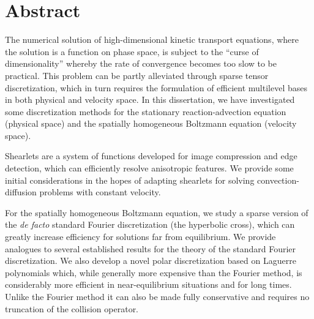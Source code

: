 \chapter*{Abstract}

The numerical solution of high-dimensional kinetic transport equations, where the solution is a function on
phase space, is subject to the ``curse of dimensionality'' whereby the rate of convergence becomes too slow to
be practical. This problem can be partly alleviated through sparse tensor discretization, which in turn
requires the formulation of efficient multilevel bases in both physical and velocity space. In this
dissertation, we have investigated some discretization methods for the stationary reaction-advection equation
(physical space) and the spatially homogeneous Boltzmann equation (velocity space).

Shearlets are a system of functions developed for image compression and edge detection, which can efficiently
resolve anisotropic features. We provide some initial considerations in the hopes of adapting shearlets for
solving convection-diffusion problems with constant velocity.

For the spatially homogeneous Boltzmann equation, we study a sparse version of the {\em de facto} standard
Fourier discretization (the hyperbolic cross), which can greatly increase efficiency for solutions far from
equilibrium. We provide analogues to several established results for the theory of the standard Fourier
discretization. We also develop a novel polar discretization based on Laguerre polynomials which, while
generally more expensive than the Fourier method, is considerably more efficient in near-equilibrium
situations and for long times. Unlike the Fourier method it can also be made fully conservative and requires
no truncation of the collision operator.
